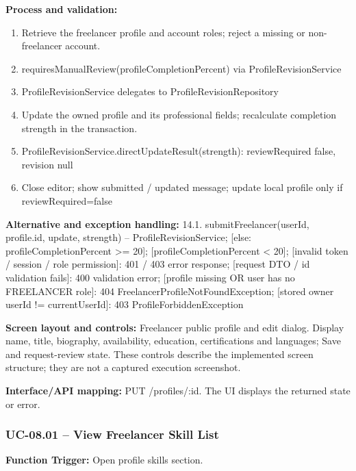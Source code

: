 \textbf{Process and validation:}
\begin{enumerate}
\item Retrieve the freelancer profile and account roles; reject a missing or non-freelancer account.
\item requires\allowbreak{}Manual\allowbreak{}Review(profile\allowbreak{}Completion\allowbreak{}Percent) via Profile\allowbreak{}Revision\allowbreak{}Service
\item Profile\allowbreak{}Revision\allowbreak{}Service delegates to Profile\allowbreak{}Revision\allowbreak{}Repository
\item Update the owned profile and its professional fields; recalculate completion strength in the transaction.
\item Profile\allowbreak{}Revision\allowbreak{}Service.direct\allowbreak{}Update\allowbreak{}Result(strength): review\allowbreak{}Required false, revision null
\item Close editor; show submitted /\allowbreak{} updated message; update local profile only if review\allowbreak{}Required=\allowbreak{}false
\end{enumerate}
\textbf{Alternative and exception handling:} 14.1. submit\allowbreak{}Freelancer(user\allowbreak{}Id, profile.id, update, strength) -- Profile\allowbreak{}Revision\allowbreak{}Service; [else: profile\allowbreak{}Completion\allowbreak{}Percent >=\allowbreak{} 20]; [profile\allowbreak{}Completion\allowbreak{}Percent < 20]; [invalid token /\allowbreak{} session /\allowbreak{} role permission]: 401 /\allowbreak{} 403 error response; [request DTO /\allowbreak{} id validation fails]: 400 validation error; [profile missing OR user has no FREELANCER role]: 404 Freelancer\allowbreak{}Profile\allowbreak{}Not\allowbreak{}Found\allowbreak{}Exception; [stored owner user\allowbreak{}Id !=\allowbreak{} current\allowbreak{}User\allowbreak{}Id]: 403 Profile\allowbreak{}Forbidden\allowbreak{}Exception

\textbf{Screen layout and controls:} Freelancer public profile and edit dialog. Display name, title, biography, availability, education, certifications and languages; Save and request-review state. These controls describe the implemented screen structure; they are not a captured execution screenshot.

\textbf{Interface/\allowbreak{}API mapping:} PUT /\allowbreak{}profiles/\allowbreak{}:id. The UI displays the returned state or error.

\subsubsection{UC-08.01 -- View Freelancer Skill List}
\textbf{Function Trigger:} Open profile skills section.

